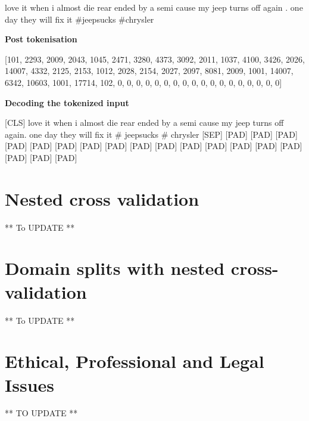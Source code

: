 \begin{adjustbox}{minipage={\textwidth},fbox}
    love it when i almost die rear ended by a semi cause my jeep turns off again . one day they will fix it \#jeepsucks \#chrysler
\end{adjustbox} \newline\newline


\textbf{Post tokenisation}\newline

\begin{adjustbox}{minipage={\textwidth},fbox}
    [101, 2293, 2009, 2043, 1045, 2471, 3280, 4373, 3092, 2011, 1037, 4100, 3426, 2026, 14007, 4332, 2125, 2153, 1012, 2028, 2154, 2027, 2097, 8081, 2009, 1001, 14007, 6342, 10603, 1001, 17714, 102, 0, 0, 0, 0, 0, 0, 0, 0, 0, 0, 0, 0, 0, 0, 0, 0, 0, 0]
\end{adjustbox} \newline\newline

\textbf{Decoding the tokenized input}\newline

\begin{adjustbox}{minipage={\textwidth},fbox}
    [CLS] love it when i almost die rear ended by a semi cause my jeep turns off again. one day they will fix it \# jeepsucks \# chrysler [SEP] [PAD] [PAD] [PAD] [PAD] [PAD] [PAD] [PAD] [PAD] [PAD] [PAD] [PAD] [PAD] [PAD] [PAD] [PAD] [PAD] [PAD] [PAD]
\end{adjustbox} \newline\newline

\section{Nested cross validation}
** To UPDATE **

\section{Domain splits with nested cross-validation}
** To UPDATE **

\section{Ethical, Professional and Legal Issues}
** TO UPDATE **
